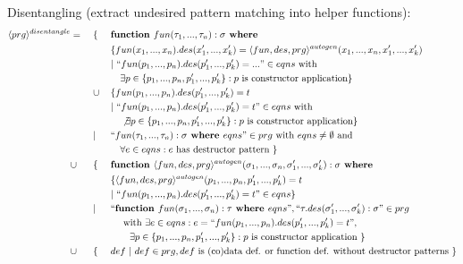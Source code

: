 \documentclass[11pt]{article} %
\begin{document}
Disentangling (extract undesired pattern matching into helper functions):
\begin{alignat*}{3}
\langle prg \rangle^{disentangle} & = ~&&\{ ~&& \textrm{\textbf{function }} fun(\tau_1, ..., \tau_n): \sigma \textrm{\textbf{ where }} \\
& && && \{ fun(x_1, ..., x_n).des(x'_1, ..., x'_k) = \langle fun, des, prg \rangle^{autogen}(x_1, ..., x_n, x'_1, ..., x'_k) \\
& && && | ~ `` fun(p_1, ..., p_n).des(p'_1, ..., p'_k) = ... " \in eqns \textrm{ with } \\
& && &&\quad \exists p \in \{p_1, ..., p_n, p'_1, ..., p'_k\}: p \textrm{ is constructor application} \} \\
& && \cup && \{ fun(p_1, ..., p_n).des(p'_1, ..., p'_k) = t \\
& && && | ~ `` fun(p_1, ..., p_n).des(p'_1, ..., p'_k) = t " \in eqns \textrm{ with } \\
& && &&\quad \not\exists p \in \{p_1, ..., p_n, p'_1, ..., p'_k\}: p \textrm{ is constructor application} \} \\
& && | && `` fun (\tau_1, ..., \tau_n): \sigma \textrm{\textbf{ where }} eqns " \in prg \textrm{ with } eqns \neq \emptyset \textrm{ and } \\
& && &&\quad \forall e \in eqns: e \textrm{ has destructor pattern }  \} \\
&\cup && \{ && \textrm{\textbf{function }} \langle fun, des, prg \rangle^{autogen}(\sigma_1, ..., \sigma_n, \sigma'_1, ..., \sigma'_k): \sigma \textrm{\textbf{ where }} \\
& && && \{ \langle fun, des, prg \rangle^{autogen}(p_1, ..., p_n, p'_1, ..., p'_k) = t \\
& && && | ~ `` fun(p_1, ..., p_n).des(p'_1, ..., p'_k) = t " \in eqns \} \\
& && | && `` \textrm{\textbf{function }} fun(\sigma_1, ..., \sigma_n): \tau \textrm{\textbf{ where }} eqns ", `` \tau.des(\sigma'_1,...,\sigma'_k): \sigma " \in prg \\
& && &&\quad \textrm{ with } \exists e \in eqns: e = `` fun(p_1, ..., p_n).des(p'_1,..., p'_k) = t ", \\
& && &&\qquad \exists p \in \{p_1, ..., p_n, p'_1, ..., p'_k\}: p \textrm{ is constructor application } \} \\
& \cup && \{ && def ~ | ~ def \in prg, def \textrm{ is (co)data def. or function def. without destructor patterns } \}
\end{alignat*}
\end{document}
